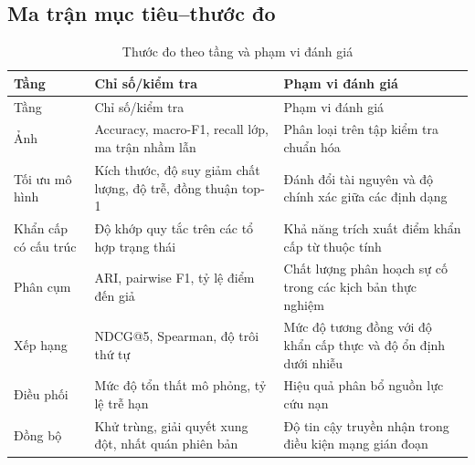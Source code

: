 \subsection{Ma trận mục tiêu--thước đo}
\begin{longtable}{P{.29\textwidth}P{.28\textwidth}P{.32\textwidth}}
\caption{Thước đo theo tầng và phạm vi đánh giá}\label{tab:metric-map}\\
\toprule Tầng & Chỉ số/kiểm tra & Phạm vi đánh giá \\\midrule\endfirsthead
\toprule Tầng & Chỉ số/kiểm tra & Phạm vi đánh giá \\\midrule\endhead
Ảnh & Accuracy, macro-F1, recall lớp, ma trận nhầm lẫn & Phân loại trên tập kiểm tra chuẩn hóa \\
Tối ưu mô hình & Kích thước, độ suy giảm chất lượng, độ trễ, đồng thuận top-1 & Đánh đổi tài nguyên và độ chính xác giữa các định dạng \\
Khẩn cấp có cấu trúc & Độ khớp quy tắc trên các tổ hợp trạng thái & Khả năng trích xuất điểm khẩn cấp từ thuộc tính \\
Phân cụm & ARI, pairwise F1, tỷ lệ điểm đến giả & Chất lượng phân hoạch sự cố trong các kịch bản thực nghiệm \\
Xếp hạng & NDCG@5, Spearman, độ trôi thứ tự & Mức độ tương đồng với độ khẩn cấp thực và độ ổn định dưới nhiễu \\
Điều phối & Mức độ tổn thất mô phỏng, tỷ lệ trễ hạn & Hiệu quả phân bổ nguồn lực cứu nạn \\
Đồng bộ & Khử trùng, giải quyết xung đột, nhất quán phiên bản & Độ tin cậy truyền nhận trong điều kiện mạng gián đoạn \\
\bottomrule
\end{longtable}

